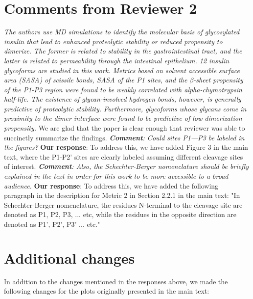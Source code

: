 \documentclass[sn-vancouver]{sn-jnl}
\begin{document}
\section*{Comments from Reviewer 2}
\textit{The authors use MD simulations to identify the molecular basis of glycosylated insulin that lead to enhanced proteolytic stability or reduced propensity to dimerize. The former is related to stability in the gastrointestinal tract, and the latter is related to permeability through the intestinal epithelium. 12 insulin glycoforms are studied in this work. Metrics based on solvent accessible surface area (SASA) of scissile bonds, SASA of the P1 sites, and the $\beta$-sheet propensity of the P1-P3 region were found to be weakly correlated with alpha-chymotrypsin half-life. The existence of glycan-involved hydrogen bonds, however, is generally predictive of proteolytic stability. Furthermore, glycoforms whose glycans come in proximity to the dimer interface were found to be predictive of low dimerization propensity.}
\newline
\indent
We are glad that the paper is clear enough that reviewer was able to succinctly summarize the findings.
\newline
\indent
\textit{\textbf{Comment}:
Could sites P1—P3 be labeled in the figures? }
\newline
\indent 
{\bf Our response}: To address this, we have added Figure 3 in the main text, where the P1-P2' sites are clearly labeled assuming different cleavage sites of interest. 
\newline
\newline
\indent
\textit{\textbf{Comment}:
Also, the Schechter-Berger nomenclature should be briefly explained in the text in order for this work to be more accessible to a broad audience.}
\newline
\indent 
{\bf Our response}: To address this, we have added the following paragraph in the description for Metric 2 in Section 2.2.1 in the main text: "In Schechter-Berger nomenclature, the residues N-terminal to the cleavage site are denoted as P1, P2, P3, ... etc, while the residues in the opposite direction are denoted as P1', P2', P3' ... etc."

\section*{Additional changes}
In addition to the changes mentioned in the responses above, we made the following changes for the plots originally presented in the main text:
\end{document}
